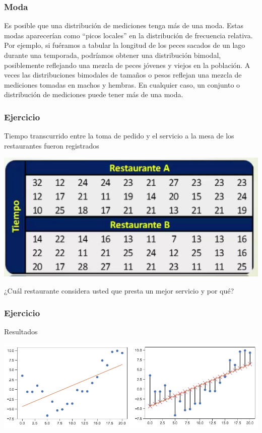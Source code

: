 \documentclass[spanish]{beamer}
\begin{document}
\begin{frame}
\frametitle{Moda}
Es posible que una distribución de mediciones tenga más de una moda. Estas modas aparecerían como “picos locales” en la distribución de frecuencia relativa. Por ejemplo, si fuéramos a tabular la longitud de los peces sacados de un lago durante una temporada, podríamos obtener una distribución bimodal, posiblemente reflejando una mezcla de peces jóvenes y viejos en la población. A veces las distribuciones bimodales de tamaños o pesos reflejan una mezcla de mediciones tomadas en machos y hembras. En cualquier caso, un conjunto o distribución de mediciones puede tener más de una moda.
\end{frame}
\begin{frame}
\frametitle{Ejercicio}
Tiempo transcurrido entre la toma de pedido y el servicio a la mesa de los restaurantes fueron registrados 
\begin{center}
\includegraphics[scale=0.4]{im9}
\end{center}
¿Cuál restaurante considera usted que presta un mejor servicio y por qué?
\end{frame}
\begin{frame}
\frametitle{Ejercicio}
Resultados
\begin{center}
\includegraphics[scale=0.5]{im10}
\end{center}
\end{frame}
\end{document}
